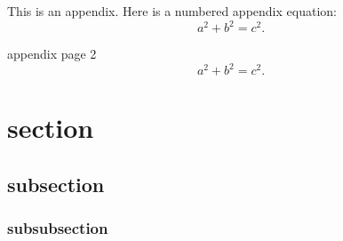 

%

This is an appendix.  Here is a numbered appendix equation:
\begin{equation}
    a^2 + b^2 = c^2.
\end{equation}

\newpage
appendix page 2
\begin{equation}
	a^2 + b^2 = c^2.
\end{equation}
\pagebreak
\section{section}
\subsection{subsection}
\subsubsection{subsubsection}

